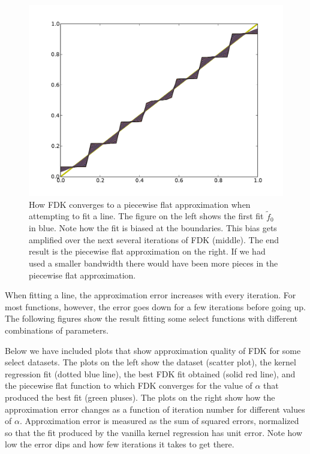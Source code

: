 \begin{figure}[!htb]
  \endminipage\hfill
    \includegraphics[width=\linewidth]{../writeup/figs/linefitend.pdf}
  \endminipage\hfill
\caption[Fitting a line]{How FDK converges to a piecewise flat approximation
when attempting to fit a line. The figure on the left shows the first fit
$\tilde f_0$ in blue. Note how the fit is biased at the boundaries.
This bias gets amplified over the next several iterations of FDK (middle).
The end result is the piecewise flat approximation on the right.
If we had used a smaller bandwidth there would have been more pieces
in the piecewise flat approximation.}
\end{figure}


When fitting a line, the approximation error increases with every iteration.
For most functions, however, the error goes down for a few iterations before going up.
The following figures show the result fitting some select functions with
different combinations of parameters.

Below we have included plots that show approximation quality of FDK for some
select datasets.
The plots on the left show the dataset (scatter plot), the kernel
regression fit (dotted blue line), the best FDK fit obtained (solid red line), and the
piecewise flat function to which FDK converges for the value of $\alpha$
that produced the best fit (green pluses).
The plots on the right show how the approximation error changes as a function of
iteration number for different values of $\alpha$.
Approximation error is measured as the sum of squared errors, normalized so that the fit produced
by the vanilla kernel regression has unit error. Note how low the error dips and how
few iterations it takes to get there.

